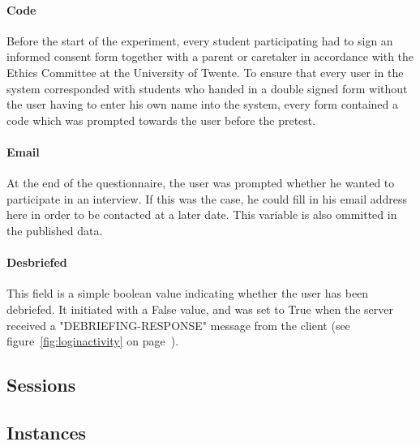 \paragraph{Code} Before the start of the experiment, every student participating had to sign an informed consent form together with a parent or caretaker in accordance with the Ethics Committee at the University of Twente. To ensure that every user in the system corresponded with students who handed in a double signed form without the user having to enter his own name into the system, every form contained a code which was prompted towards the user before the pretest.

\paragraph{Email} At the end of the questionnaire, the user was prompted whether he wanted to participate in an interview. If this was the case, he could fill in his email address here in order to be contacted at a later date. This variable is also ommitted in the published data.

\paragraph{Desbriefed} This field is a simple boolean value indicating whether the user has been debriefed. It initiated with a False value, and was set to True when the server received a "DEBRIEFING-RESPONSE" message from the client (see figure~\ref{fig:loginactivity} on page~\pageref{fig:loginactivity}).

\subsection{Sessions}

\subsection{Instances}


